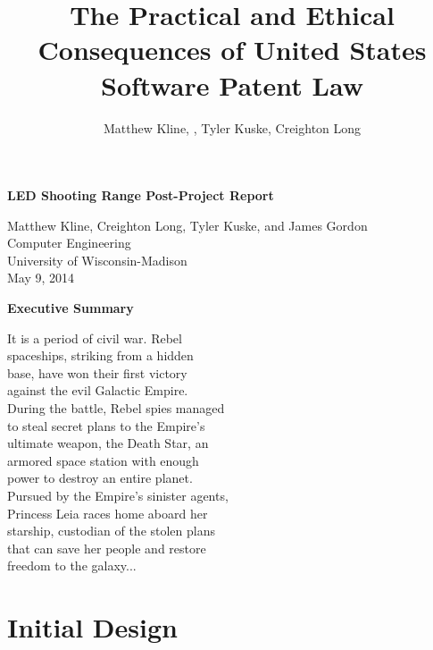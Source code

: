 \documentclass[oneside]{book}
\begin{document}
\title{The Practical and Ethical Consequences of United States Software Patent Law}
\author{Matthew Kline, , Tyler Kuske, Creighton Long}
\begin{titlepage}
\vspace*{\fill}
\begin{Large}
\begin{center}
\textbf{LED Shooting Range Post-Project Report}

Matthew Kline, Creighton Long, Tyler Kuske, and James Gordon \\
Computer Engineering \\
University of Wisconsin-Madison \\
May 9, 2014
\end{center}
\end{Large}
\vspace*{\fill}
\end{titlepage}
\frontmatter
\begin{Large}
\begin{center}
\textbf{Executive Summary}
\end{center}
\end{Large}

\noindent
It is a period of civil war. Rebel \\
spaceships, striking from a hidden \\
base, have won their first victory \\
against the evil Galactic Empire. \\

\noindent
During the battle, Rebel spies managed \\
to steal secret plans to the Empire's \\
ultimate weapon, the Death Star, an \\
armored space station with enough \\
power to destroy an entire planet. \\

\noindent
Pursued by the Empire's sinister agents, \\
Princess Leia races home aboard her \\
starship, custodian of the stolen plans \\
that can save her people and restore \\
freedom to the galaxy...
\newpage
\tableofcontents
\newpage
{}
\mainmatter

\section{Initial Design}
\end{document}
